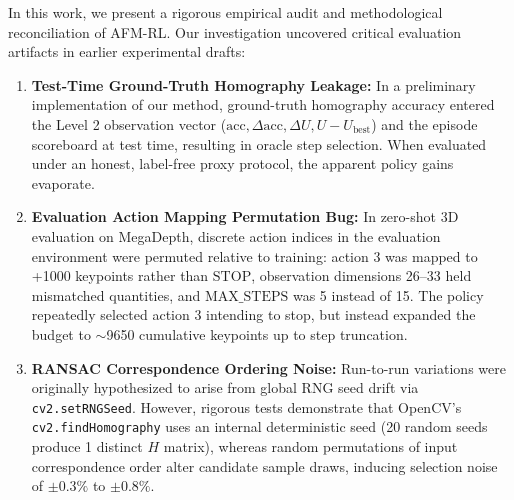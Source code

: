 \documentclass[conference]{IEEEtran}
\begin{document}
In this work, we present a rigorous empirical audit and methodological reconciliation of AFM-RL. Our investigation uncovered critical evaluation artifacts in earlier experimental drafts:
\begin{enumerate}
    \item \textbf{Test-Time Ground-Truth Homography Leakage:} In a preliminary implementation of our method, ground-truth homography accuracy entered the Level 2 observation vector ($\text{acc}, \Delta\text{acc}, \Delta U, U - U_{\text{best}}$) and the episode scoreboard at test time, resulting in oracle step selection. When evaluated under an honest, label-free proxy protocol, the apparent policy gains evaporate.
    \item \textbf{Evaluation Action Mapping Permutation Bug:} In zero-shot 3D evaluation on MegaDepth, discrete action indices in the evaluation environment were permuted relative to training: action 3 was mapped to +1000 keypoints rather than $\mathrm{STOP}$, observation dimensions 26--33 held mismatched quantities, and $\text{MAX\_STEPS}$ was 5 instead of 15. The policy repeatedly selected action 3 intending to stop, but instead expanded the budget to $\sim$9650 cumulative keypoints up to step truncation.
    \item \textbf{RANSAC Correspondence Ordering Noise:} Run-to-run variations were originally hypothesized to arise from global RNG seed drift via \texttt{cv2.setRNGSeed}. However, rigorous tests demonstrate that OpenCV's \texttt{cv2.findHomography} uses an internal deterministic seed (20 random seeds produce 1 distinct $H$ matrix), whereas random permutations of input correspondence order alter candidate sample draws, inducing selection noise of $\pm 0.3\%$ to $\pm 0.8\%$.
\end{enumerate}
\end{document}
